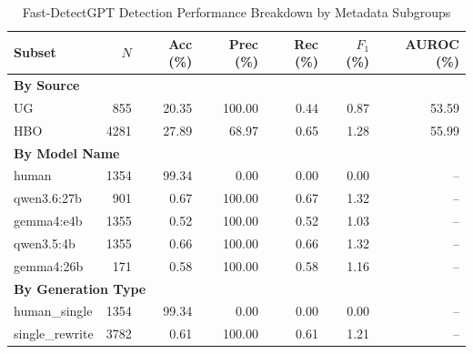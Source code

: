 \begin{table}[htbp]
\centering
\caption{Fast-DetectGPT Detection Performance Breakdown by Metadata Subgroups}
\label{tab:fdgpt_breakdown_results}
\begin{tabular}{lrrrrrr}
\toprule
\textbf{Subset} & \textbf{$N$} & \textbf{Acc (\%)} & \textbf{Prec (\%)} & \textbf{Rec (\%)} & \textbf{$F_1$ (\%)} & \textbf{AUROC (\%)} \\
\midrule
\multicolumn{7}{l}{\textbf{By Source}} \\
\quad UG & 855 & 20.35 & 100.00 & 0.44 & 0.87 & 53.59 \\
\quad HBO & 4281 & 27.89 & 68.97 & 0.65 & 1.28 & 55.99 \\
\midrule
\multicolumn{7}{l}{\textbf{By Model Name}} \\
\quad human & 1354 & 99.34 & 0.00 & 0.00 & 0.00 & -- \\
\quad qwen3.6:27b & 901 & 0.67 & 100.00 & 0.67 & 1.32 & -- \\
\quad gemma4:e4b & 1355 & 0.52 & 100.00 & 0.52 & 1.03 & -- \\
\quad qwen3.5:4b & 1355 & 0.66 & 100.00 & 0.66 & 1.32 & -- \\
\quad gemma4:26b & 171 & 0.58 & 100.00 & 0.58 & 1.16 & -- \\
\midrule
\multicolumn{7}{l}{\textbf{By Generation Type}} \\
\quad human_single & 1354 & 99.34 & 0.00 & 0.00 & 0.00 & -- \\
\quad single_rewrite & 3782 & 0.61 & 100.00 & 0.61 & 1.21 & -- \\
\bottomrule
\end{tabular}
\end{table}